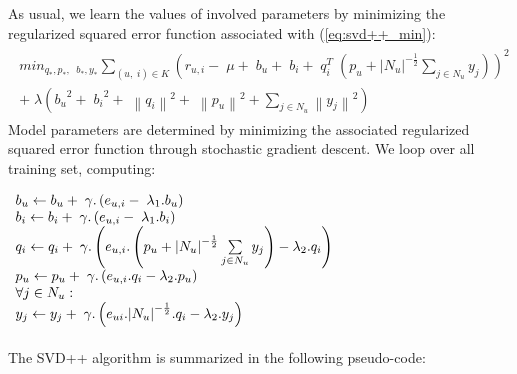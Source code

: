 \documentclass[oneside,13pt]{extreport}
\begin{document}
As usual, we learn the values of involved parameters by minimizing the regularized squared error function associated with (\ref{eq:svd++_min}): 
\begin{eqnarray}
\label{eq:svd++_min}
\begin{aligned}
mi{n_{{q_*},{p_*},\;\;{b_*},{y_*}}}\mathop \sum \limits_{\left( {u,\;i} \right) \in K} {\left( {{r_{u,i}} - \;\mu  + \;{b_u} + \;{b_i} + \;q_i^T\;\left( {{p_u} + {{\left| {{N_u}} \right|}^{ - \frac{1}{2}}}\sum\limits_{j  \in {N_u}} {{y_j}} } \right)} \right)^2} \\+ \;\lambda \left( {{b_u}^2 + \;{b_i}^2 + \;{{\left\| {{q_i}} \right\|}^2} + \;{{\left\| {{p_u}} \right\|}^2} + \sum\limits_{j \in {N_u}} {{{\left\| {{y_j}} \right\|}^2}} } \right)
\end{aligned}
\end{eqnarray}
Model parameters are determined by minimizing the associated regularized
squared error function through stochastic gradient descent. We loop over all training set, computing:

$
\begin{array}{l}{b_u} \leftarrow {b_u} + {\rm{\;}}{\gamma}.\left( {{e_{u,i}} - {\rm{\;}}{\lambda _1}.{b_u}} \right)\\{b_i} \leftarrow {b_i} + {\rm{\;}}{\gamma}.\left( {{e_{u,i}} - {\rm{\;}}{\lambda _1}.{b_i}} \right)\\{q_i} \leftarrow {q_i} + {\rm{\;}}{\gamma}.\left( {{e_{u,i}}.\left( {{p_u} + {{\left| {{N_u}} \right|}^{ - \frac{1}{2}}}\sum\limits_{j \in {N_u}} {{y_j}} } \right) - {\lambda _2}.{q_i}} \right)\\{p_u} \leftarrow {p_u} + {\rm{\;}}{\gamma}.\left( {{e_{u,i}}.{q_i} - {\lambda _2}.{p_u}} \right)\\\forall j \in {N_u}:\\{y_j} \leftarrow {y_j} + {\rm{\;}}{\gamma}.\left( {{e_{ui}}.{{\left| {{N_u}} \right|}^{ - \frac{1}{2}}}.{q_i} - {\lambda _2}.{y_j}} \right)\end{array}
$
\\\\
The SVD++ algorithm is summarized in the following pseudo-code:
\\
\end{document}
